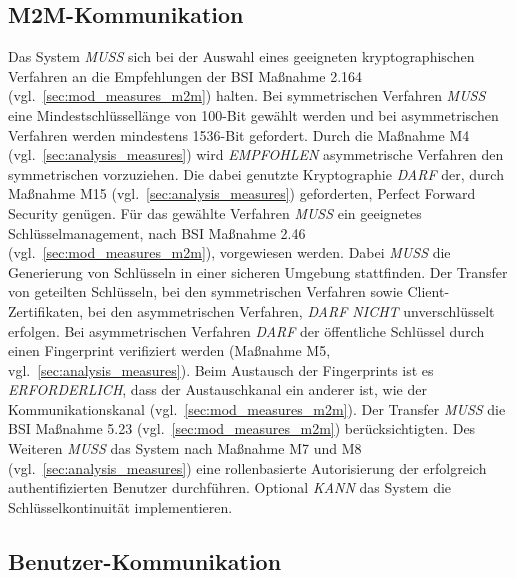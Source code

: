 \documentclass[11pt,a4paper]{report}
\begin{document}
\subsection{M2M-Kommunikation}

Das System \textit{MUSS} sich bei der Auswahl eines geeigneten kryptographischen Verfahren an die Empfehlungen der BSI Maßnahme 2.164 (vgl.~\ref{sec:mod_measures_m2m}) halten. Bei symmetrischen Verfahren \textit{MUSS} eine Mindestschlüssellänge von 100-Bit gewählt werden und bei asymmetrischen Verfahren werden mindestens 1536-Bit gefordert. Durch die Maßnahme M4 (vgl.~\ref{sec:analysis_measures}) wird \textit{EMPFOHLEN} asymmetrische Verfahren den symmetrischen vorzuziehen. Die dabei genutzte Kryptographie \textit{DARF} der, durch Maßnahme M15 (vgl.~\ref{sec:analysis_measures}) geforderten, Perfect Forward Security genügen. Für das gewählte Verfahren \textit{MUSS} ein geeignetes Schlüsselmanagement, nach BSI Maßnahme 2.46 (vgl.~\ref{sec:mod_measures_m2m}), vorgewiesen werden. Dabei \textit{MUSS} die Generierung von Schlüsseln in einer sicheren Umgebung stattfinden. Der Transfer von geteilten Schlüsseln, bei den symmetrischen Verfahren sowie Client-Zertifikaten, bei den asymmetrischen Verfahren, \textit{DARF NICHT} unverschlüsselt erfolgen. Bei asymmetrischen Verfahren \textit{DARF} der öffentliche Schlüssel durch einen Fingerprint verifiziert werden (Maßnahme M5, vgl.~\ref{sec:analysis_measures}). Beim Austausch der Fingerprints ist es \textit{ERFORDERLICH}, dass der Austauschkanal ein anderer ist, wie der Kommunikationskanal (vgl.~\ref{sec:mod_measures_m2m}). Der Transfer \textit{MUSS} die BSI Maßnahme 5.23 (vgl.~\ref{sec:mod_measures_m2m}) berücksichtigten. Des Weiteren \textit{MUSS} das System nach Maßnahme M7 und M8 (vgl.~\ref{sec:analysis_measures}) eine rollenbasierte Autorisierung der erfolgreich authentifizierten Benutzer durchführen. Optional \textit{KANN} das System die Schlüsselkontinuität implementieren.

\subsection{Benutzer-Kommunikation}
\end{document}
